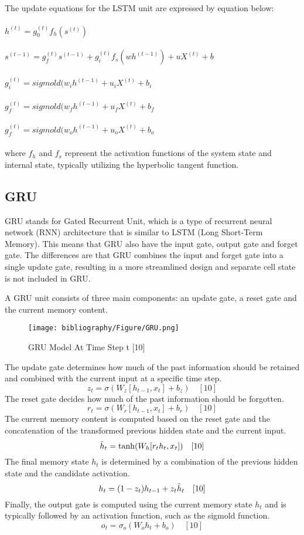 \documentclass{ieeeojies}
\begin{document}
The update equations for the LSTM unit are expressed by equation below: \\
\\$h^{(t)} = g_0^{(t)}f_h(s^{(t)})$ \quad[10]\\
\\$s^{(t-1)} = g_f^{(t)}s^{(t-1)} + g_i^{(t)}f_s(wh^{(t-1)}) + uX^{(t)} + b$ \quad[10]\\
\\$g_i^{(t)} = sigmold (w_ih^{(t-1)} + u_iX^{(t)} + b_i$ \quad[10]\\
\\$g_f^{(t)} = sigmold (w_fh^{(t-1)} + u_fX^{(t)} + b_f$ \quad[10]\\
\\$g_f^{(t)} = sigmold (w_oh^{(t-1)} + u_oX^{(t)} + b_o$ \quad[10]\\
\\ where $f_h$ and $f_s$
represent the activation functions of the 
system state and internal state, typically utilizing the 
hyperbolic tangent function.

\subsection{GRU}
GRU stands for Gated Recurrent Unit, which is a type of recurrent neural network (RNN) architecture that is similar to LSTM (Long Short-Term Memory). This means that GRU also have the input gate, output gate and forget gate. The differences are that GRU combines the input and forget gate into a single update gate, resulting in a more streamlined design and separate cell state is not included in GRU.

A GRU unit consists of three main components: an update gate, a reset gate and the current memory content.

\begin{figure}[H]
  \centering
  \begin{minipage}{0.8\linewidth}
    \centering
    \texttt{[image: bibliography/Figure/GRU.png]}
    \caption{GRU Model At Time Step t [10]}
    \label{fig10}
  \end{minipage}
\end{figure}

The update gate determines how much of the past information should be retained and combined with the current input at a specific time step.
\[z_t = \sigma(W_z[h_{t-1},x_t] + b_z)\quad[10]\]
The reset gate decides how much of the past information should be forgotten.
\[r_t = \sigma(W_r[h_{t-1},x_t] + b_r)\quad[10]\]
The current memory content is computed based on the reset gate and the concatenation of the transformed previous hidden state and the current input.
\[\Tilde{h}_t = \tanh(W_h[r_{t}h_{t},x_t])\quad[10]\]
The final memory state $h_t$ is determined by a combination of the previous hidden state and the candidate activation.
\[h_t = (1 - z_t)h_{t-1} + z_{t}\Tilde{h}_t\quad[10]\]
Finally, the output gate is computed using the current memory state $h_t$ and is typically followed by an activation function, such as the sigmold function.
\[o_t = \sigma_o(W_{o}h_t + b_o)\quad[10]\]
\end{document}
